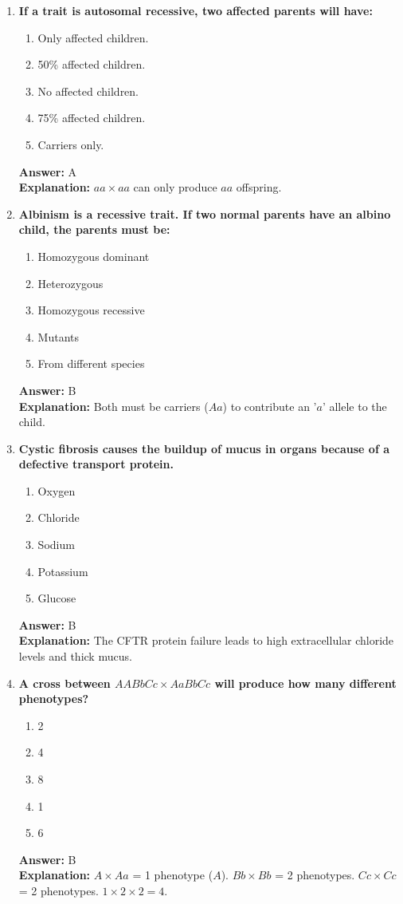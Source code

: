 \documentclass[11pt, a4paper]{article}
\begin{document}
\begin{enumerate}[leftmargin=*, label=\arabic*.]
\item \textbf{If a trait is autosomal recessive, two affected parents will have:}
\begin{enumerate}[label=\Alph*.]
\item Only affected children.
\item 50\% affected children.
\item No affected children.
\item 75\% affected children.
\item Carriers only.
\end{enumerate}
\textbf{Answer:} A \\
\textbf{Explanation:} $aa \times aa$ can only produce $aa$ offspring.

\item \textbf{Albinism is a recessive trait. If two normal parents have an albino child, the parents must be:}
\begin{enumerate}[label=\Alph*.]
\item Homozygous dominant
\item Heterozygous
\item Homozygous recessive
\item Mutants
\item From different species
\end{enumerate}
\textbf{Answer:} B \\
\textbf{Explanation:} Both must be carriers ($Aa$) to contribute an '$a$' allele to the child.

\item \textbf{Cystic fibrosis causes the buildup of mucus in organs because of a defective \underline{\hspace{1cm}} transport protein.}
\begin{enumerate}[label=\Alph*.]
\item Oxygen
\item Chloride
\item Sodium
\item Potassium
\item Glucose
\end{enumerate}
\textbf{Answer:} B \\
\textbf{Explanation:} The CFTR protein failure leads to high extracellular chloride levels and thick mucus.

\item \textbf{A cross between $AABbCc \times AaBbCc$ will produce how many different phenotypes?}
\begin{enumerate}[label=\Alph*.]
\item 2
\item 4
\item 8
\item 1
\item 6
\end{enumerate}
\textbf{Answer:} B \\
\textbf{Explanation:} $A \times Aa$ = 1 phenotype ($A$). $Bb \times Bb$ = 2 phenotypes. $Cc \times Cc$ = 2 phenotypes. $1 \times 2 \times 2 = 4$.


\end{enumerate}
\end{document}
